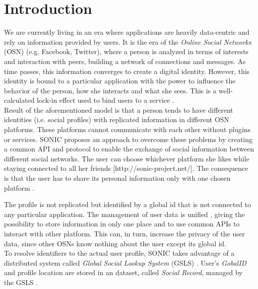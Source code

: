 \section{Introduction}
\label{S:1}

We are currently living in an era where applications are heavily data-centric and rely on information provided by users. It is the era of the \textit{Online Social Networks} (OSN) \cite{gondor_sonic:_2014} (e.g. Facebook, Twitter), where a person is analyzed in terms of interests and interaction with peers, building a network of connections and messages. As time passes, this information converges to create a digital identity. However, this identity is bound to a particular application with the power to influence the behavior of the person, how she interacts and what she sees. This is a well-calculated lock-in effect used to bind users to a service \cite{gondor_distributed_2016}. 
\\

Result of the aforementioned model is that a person tends to have different identities (i.e. social profiles) with replicated information in different OSN platforms. These platforms cannot communicate with each other without plugins or services. SONIC proposes an approach to overcome these problems by creating a common API and protocol to enable the exchange of social information between different social networks. The user can choose whichever platform she likes while staying connected to all her friends [http://sonic-project.net/]. The consequence is that the user has to share its personal information only with one chosen platform \cite{gondor_sonic:_2014}. 

The profile is not replicated but identified by a global id that is not connected to any particular application. The management of user data is unified \cite{identity_mgmt_2003}, giving the possibility to store information in only one place and to use common APIs to interact with other platform. This can, in turn, increase the privacy of the user data, since other OSNs know nothing about the user except its global id.
\\

To resolve identifiers to the actual user profile, SONIC takes advantage of a distributed system called \textit{Global Social Lookup System} (GSLS) \cite{gondor_distributed_2016}. User's \textit{GobalID} and profile location are stored in an dataset, called \textit{Social Record}, managed by the GSLS \cite{gondor_distributed_2016}.
\\

